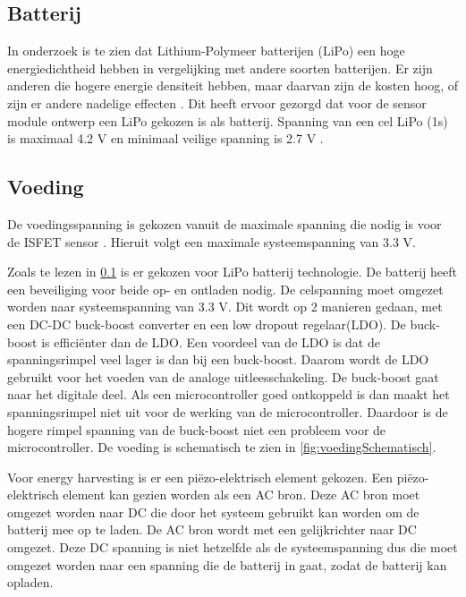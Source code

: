 \subsection{Batterij} \label{sec:battery}
In onderzoek \cite{BatteryComparison} is te zien dat Lithium-Polymeer batterijen (LiPo) een hoge energiedichtheid hebben in vergelijking met andere soorten batterijen. Er zijn anderen die hogere energie densiteit hebben, maar daarvan zijn de kosten hoog, of zijn er andere nadelige effecten \cite{BatteryComparison}. Dit heeft ervoor gezorgd dat voor de sensor module ontwerp een LiPo gekozen is als batterij. Spanning van een cel LiPo (1s) is maximaal 4.2 V en minimaal veilige spanning is 2.7 V \cite{BatteryComparison}.

\subsection{Voeding} \label{sec:voeding} 


De voedingsspanning is gekozen vanuit de maximale spanning die nodig is voor de ISFET sensor \cite{isfet}. Hieruit volgt een maximale systeemspanning van 3.3 V. 


Zoals te lezen in \cref{sec:battery} is er gekozen voor LiPo batterij technologie. De batterij heeft een beveiliging voor beide op- en ontladen nodig. De celspanning moet omgezet worden naar systeemspanning van 3.3 V. Dit wordt op 2 manieren gedaan, met een DC-DC buck-boost converter en een low dropout regelaar(LDO). De buck-boost is efficiënter dan de LDO. Een voordeel van de LDO is dat de spanningsrimpel veel lager is dan bij een buck-boost. Daarom wordt de LDO gebruikt voor het voeden van de analoge uitleesschakeling. De buck-boost gaat naar het digitale deel. Als een microcontroller goed ontkoppeld is dan maakt het spanningsrimpel niet uit voor de werking van de microcontroller. Daardoor is de hogere rimpel spanning van de buck-boost niet een probleem voor de microcontroller. De voeding is schematisch te zien in \cref{fig:voedingSchematisch}.

Voor energy harvesting is er een piëzo-elektrisch element gekozen. Een piëzo-elektrisch element kan gezien worden als een AC bron. Deze AC bron moet omgezet worden naar DC die door het systeem gebruikt kan worden om de batterij mee op te laden. De AC bron wordt met een gelijkrichter naar DC omgezet. Deze DC spanning is niet hetzelfde als de systeemspanning dus die moet omgezet worden naar een spanning die de batterij in gaat, zodat de batterij kan opladen.

